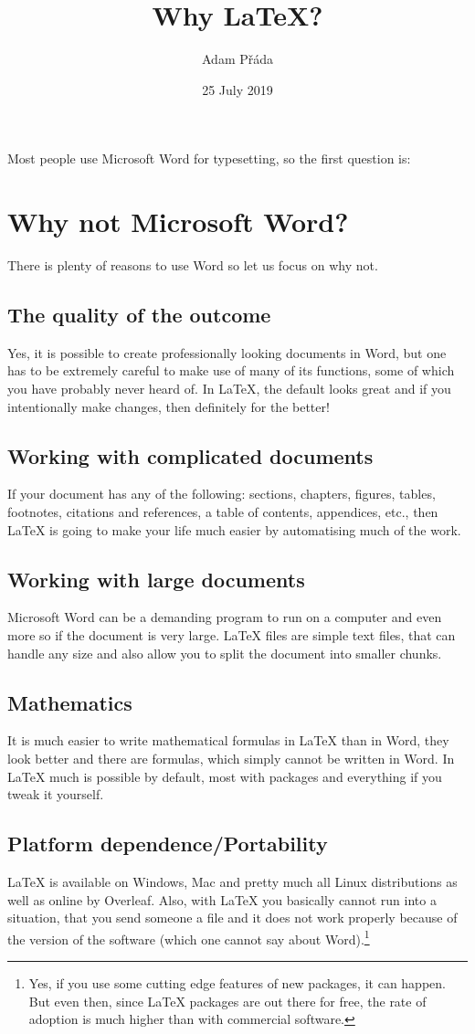 \documentclass[11pt]{article}
\title{Why \LaTeX?}
\author{Adam Přáda}
\date{25 July 2019}
\begin{document}
\maketitle
Most people use Microsoft Word for typesetting, so the first question is:
\section{Why not Microsoft Word?}
There is plenty of reasons to use Word so let us focus on why not.
\subsection{The quality of the outcome}
Yes, it is possible to create professionally looking documents in Word, but one has to be extremely careful to make use of many of its functions, some of which you have probably never heard of. In LaTeX, the default looks great and if you intentionally make changes, then definitely for the better!
\subsection{Working with complicated documents}
If your document has any of the following: sections, chapters, figures, tables, footnotes, citations and references, a table of contents, appendices, etc., then LaTeX is going to make your life much easier by automatising much of the work.
\subsection{Working with large documents}
Microsoft Word can be a demanding program to run on a computer and even more so if the document is very large. LaTeX files are simple text files, that can handle any size and also allow you to split the document into smaller chunks.
\pagebreak
\subsection{Mathematics}
It is much easier to write mathematical formulas in LaTeX than in Word, they look better and there are formulas, which simply cannot be written in Word. In LaTeX much is possible by default, most with packages and everything if you tweak it yourself.
\subsection{Platform dependence/Portability}
LaTeX is available on Windows, Mac and pretty much all Linux distributions as well as online by Overleaf. Also, with LaTeX you basically cannot run into a situation, that you send someone a file and it does not work properly because of the version of the software (which one cannot say about Word).\footnote{Yes, if you use some cutting edge features of new packages, it can happen. But even then, since LaTeX packages are out there for free, the rate of adoption is much higher than with commercial software.}
\end{document}
